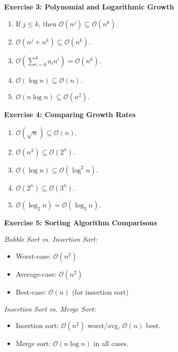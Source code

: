 \documentclass{article}
\theoremstyle{theorem}
\theoremstyle{definition}
\theoremstyle{remark}
\begin{document}
\vspace{1em}
\textbf{Exercise 3: Polynomial and Logarithmic Growth}

\begin{enumerate}
    \item If $j \leq k$, then $\mathcal{O}(n^j) \subseteq \mathcal{O}(n^k)$.
    \item $\mathcal{O}(n^j + n^k) \subseteq \mathcal{O}(n^k)$.
    \item $\mathcal{O}\left(\sum_{i=0}^k a_i n^i\right) = \mathcal{O}(n^k)$.
    \item $\mathcal{O}(\log n) \subseteq \mathcal{O}(n)$.
    \item $\mathcal{O}(n \log n) \subseteq \mathcal{O}(n^2)$.
\end{enumerate}

\vspace{1em}
\textbf{Exercise 4: Comparing Growth Rates}

\begin{enumerate}
    \item $\mathcal{O}(\sqrt{n}) \subseteq \mathcal{O}(n)$.
    \item $\mathcal{O}(n^2) \subseteq \mathcal{O}(2^n)$.
    \item $\mathcal{O}(\log n) \subseteq \mathcal{O}(\log^2 n)$.
    \item $\mathcal{O}(2^n) \subseteq \mathcal{O}(3^n)$.
    \item $\mathcal{O}(\log_2 n) = \mathcal{O}(\log_3 n)$.
\end{enumerate}

\vspace{1em}
\textbf{Exercise 5: Sorting Algorithm Comparisons}

\textit{Bubble Sort vs. Insertion Sort:}
\begin{itemize}
    \item Worst-case: $\mathcal{O}(n^2)$
    \item Average-case: $\mathcal{O}(n^2)$
    \item Best-case: $\mathcal{O}(n)$ (for insertion sort)
\end{itemize}

\textit{Insertion Sort vs. Merge Sort:}
\begin{itemize}
    \item Insertion sort: $\mathcal{O}(n^2)$ worst/avg, $\mathcal{O}(n)$ best.
    \item Merge sort: $\mathcal{O}(n \log n)$ in all cases.
\end{itemize}
\end{document}
